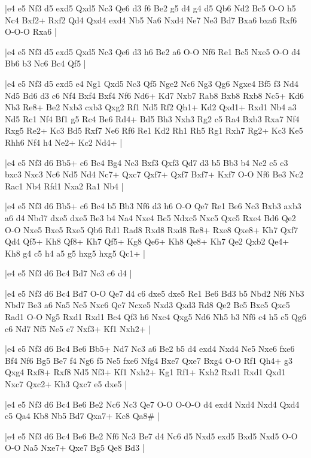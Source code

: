 \whitename{}
\blackname{}
\makegametitle
|e4 e5 Nf3 d5 exd5 Qxd5 Nc3 Qe6 d3 f6 Be2 g5 d4 g4 d5 Qb6 Nd2 Bc5 O-O h5 Nc4 Bxf2+ Rxf2 Qd4 Qxd4 exd4 Nb5 Na6 Nxd4 Ne7 Ne3 Bd7 Bxa6 bxa6 Rxf6 O-O-O Rxa6  |

\whitename{}
\blackname{}
\makegametitle
|e4 e5 Nf3 d5 exd5 Qxd5 Nc3 Qe6 d3 h6 Be2 a6 O-O Nf6 Re1 Bc5 Nxe5 O-O d4 Bb6 b3 Nc6 Bc4 Qf5  |

\whitename{}
\blackname{}
\makegametitle
|e4 e5 Nf3 d5 exd5 e4 Ng1 Qxd5 Nc3 Qf5 Nge2 Nc6 Ng3 Qg6 Ngxe4 Bf5 f3 Nd4 Nd5 Bd6 d3 c6 Nf4 Bxf4 Bxf4 Nf6 Nd6+ Kd7 Nxb7 Rab8 Bxb8 Rxb8 Nc5+ Kd6 Nb3 Re8+ Be2 Nxb3 cxb3 Qxg2 Rf1 Nd5 Rf2 Qh1+ Kd2 Qxd1+ Rxd1 Nb4 a3 Nd5 Rc1 Nf4 Bf1 g5 Rc4 Be6 Rd4+ Bd5 Bh3 Nxh3 Rg2 c5 Ra4 Bxb3 Rxa7 Nf4 Rxg5 Re2+ Kc3 Bd5 Rxf7 Ne6 Rf6 Re1 Kd2 Rh1 Rh5 Rg1 Rxh7 Rg2+ Kc3 Ke5 Rhh6 Nf4 h4 Ne2+ Kc2 Nd4+  |

\whitename{}
\blackname{}
\makegametitle
|e4 e5 Nf3 d6 Bb5+ c6 Bc4 Bg4 Nc3 Bxf3 Qxf3 Qd7 d3 b5 Bb3 b4 Ne2 c5 c3 bxc3 Nxc3 Nc6 Nd5 Nd4 Nc7+ Qxc7 Qxf7+ Qxf7 Bxf7+ Kxf7 O-O Nf6 Be3 Nc2 Rac1 Nb4 Rfd1 Nxa2 Ra1 Nb4  |

\whitename{}
\blackname{}
\makegametitle
|e4 e5 Nf3 d6 Bb5+ c6 Bc4 b5 Bb3 Nf6 d3 h6 O-O Qe7 Re1 Be6 Nc3 Bxb3 axb3 a6 d4 Nbd7 dxe5 dxe5 Be3 b4 Na4 Nxe4 Bc5 Ndxc5 Nxc5 Qxc5 Rxe4 Bd6 Qe2 O-O Nxe5 Bxe5 Rxe5 Qb6 Rd1 Rad8 Rxd8 Rxd8 Re8+ Rxe8 Qxe8+ Kh7 Qxf7 Qd4 Qf5+ Kh8 Qf8+ Kh7 Qf5+ Kg8 Qe6+ Kh8 Qe8+ Kh7 Qe2 Qxb2 Qe4+ Kh8 g4 c5 h4 a5 g5 hxg5 hxg5 Qc1+  |

\whitename{}
\blackname{}
\makegametitle
|e4 e5 Nf3 d6 Bc4 Bd7 Nc3 c6 d4  |

\whitename{}
\blackname{}
\makegametitle
|e4 e5 Nf3 d6 Bc4 Bd7 O-O Qe7 d4 c6 dxe5 dxe5 Re1 Be6 Bd3 b5 Nbd2 Nf6 Nb3 Nbd7 Be3 a6 Na5 Nc5 Nxc6 Qc7 Ncxe5 Nxd3 Qxd3 Rd8 Qe2 Bc5 Bxc5 Qxc5 Rad1 O-O Ng5 Rxd1 Rxd1 Bc4 Qf3 h6 Nxc4 Qxg5 Nd6 Nh5 b3 Nf6 c4 h5 c5 Qg6 c6 Nd7 Nf5 Ne5 c7 Nxf3+ Kf1 Nxh2+  |

\whitename{}
\blackname{}
\makegametitle
|e4 e5 Nf3 d6 Bc4 Be6 Bb5+ Nd7 Nc3 a6 Be2 b5 d4 exd4 Nxd4 Ne5 Nxe6 fxe6 Bf4 Nf6 Bg5 Be7 f4 Ng6 f5 Ne5 fxe6 Nfg4 Bxe7 Qxe7 Bxg4 O-O Rf1 Qh4+ g3 Qxg4 Rxf8+ Rxf8 Nd5 Nf3+ Kf1 Nxh2+ Kg1 Rf1+ Kxh2 Rxd1 Rxd1 Qxd1 Nxc7 Qxc2+ Kh3 Qxc7 e5 dxe5  |

\whitename{}
\blackname{}
\makegametitle
|e4 e5 Nf3 d6 Bc4 Be6 Be2 Nc6 Nc3 Qe7 O-O O-O-O d4 exd4 Nxd4 Nxd4 Qxd4 c5 Qa4 Kb8 Nb5 Bd7 Qxa7+ Kc8 Qa8\#  |

\whitename{}
\blackname{}
\makegametitle
|e4 e5 Nf3 d6 Bc4 Be6 Be2 Nf6 Nc3 Be7 d4 Nc6 d5 Nxd5 exd5 Bxd5 Nxd5 O-O O-O Na5 Nxe7+ Qxe7 Bg5 Qe8 Bd3  |

